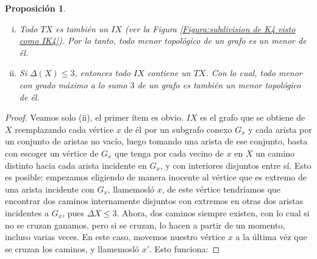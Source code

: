 \documentclass[12pt]{report}
\theoremstyle{plain}
\newtheorem{proposition}[theorem]{Proposición}
\theoremstyle{definition}
\begin{document}
\begin{proposition}
\begin{enumerate}[(i)]
\item Todo $TX$ es también un $IX$ (ver la Figura \ref{Figura:subdivision de K4 visto como IK4}). Por lo tanto, todo menor topológico de un grafo es un menor de él.
\item Si $\Delta (X) \leq 3$, entonces todo $IX$ contiene un $TX$. Con lo cual, todo menor con grado máximo a lo sumo $3$ de un grafo es también un menor topológico de él.
\end{enumerate}
\end{proposition}
\begin{proof}
Veamos solo (ii), el primer ítem es obvio. $IX$ es el grafo que se obtiene de $X$ reemplazando cada vértice $x$ de él por un subgrafo conexo $G_x$ y cada arista por un conjunto de aristas no vacío, luego tomando una arista de ese conjunto, basta con escoger un vértice de $G_x$ que tenga por cada vecino de $x$ en $X$ un camino distinto hacia cada arista incidente en $G_x$, y con interiores disjuntos entre sí. Esto es posible: empezamos eligiendo de manera inocente al vértice que es extremo de una arista incidente con $G_x$, llamemosló $x$, de este vértice tendríamos que encontrar dos caminos internamente disjuntos con extremos en otras dos aristas incidentes a $G_x$, pues $\Delta X \leq 3$. Ahora, dos caminos siempre existen, con lo cual si no se cruzan ganamos, pero si se cruzan, lo hacen a partir de un momento, incluso varias veces. En este caso, movemos nuestro vértice $x$ a la última véz que se cruzan los caminos, y llamemosló $x'$. Esto funciona:

\end{proof}

\end{document}
